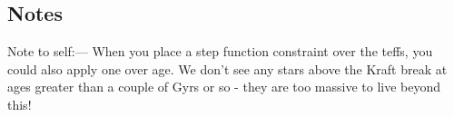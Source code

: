 \documentclass[12pt,preprint]{aastex}
\begin{document}
\subsection{Notes}

Note to self:--- When you place a step function constraint over the teffs, you could also apply one over age.
We don't see any stars above the Kraft break at ages greater than a couple of Gyrs or so - they are too massive to live beyond this!





\end{document}
